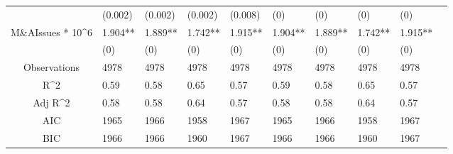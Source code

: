 \documentclass{article}
\begin{document}
\begin{table}[H]
\begin{tabular}{|clllllllll|}
   & (0.002) & (0.002) & (0.002) & (0.008) & (0) & (0) & (0) & (0) & \\ 
  M\&AIssues * 10^6 & 1.904** & 1.889** & 1.742** & 1.915** & 1.904** & 1.889** & 1.742** & 1.915** & \\ 
   & (0) & (0) & (0) & (0) & (0) & (0) & (0) & (0) & \\ 
  \hline 
 Observations & 4978 & 4978 & 4978 & 4978 & 4978 & 4978 & 4978 & 4978 & \\ 
  R^2 & 0.59 & 0.58 & 0.65 & 0.57 & 0.59 & 0.58 & 0.65 & 0.57 & \\ 
  Adj R^2 & 0.58 & 0.58 & 0.64 & 0.57 & 0.58 & 0.58 & 0.64 & 0.57 & \\ 
  AIC & 1965 & 1966 & 1958 & 1967 & 1965 & 1966 & 1958 & 1967 & \\ 
  BIC & 1966 & 1966 & 1960 & 1967 & 1966 & 1966 & 1960 & 1967 & \\ 
   \hline
\end{tabular}
 
\end{table}
\end{document}
